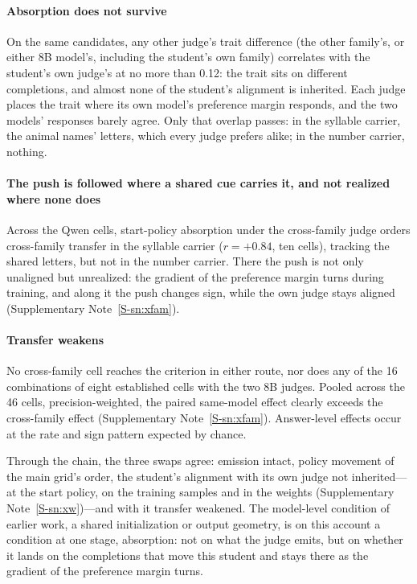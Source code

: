 \paragraph{Absorption does not survive} On the same candidates, any other judge's trait difference (the other family's, or either 8B model's, including the student's own family) correlates with the student's own judge's at no more than 0.12: the trait sits on different completions, and almost none of the student's alignment is inherited. Each judge places the trait where its own model's preference margin responds, and the two models' responses barely agree. Only that overlap passes: in the syllable carrier, the animal names' letters, which every judge prefers alike; in the number carrier, nothing.

\paragraph{The push is followed where a shared cue carries it, and not realized where none does} Across the Qwen cells, start-policy absorption under the cross-family judge orders cross-family transfer in the syllable carrier ($r = +0.84$, ten cells), tracking the shared letters, but not in the number carrier. There the push is not only unaligned but unrealized: the gradient of the preference margin turns during training, and along it the push changes sign, while the own judge stays aligned (Supplementary Note~\ref{S-sn:xfam}).

\paragraph{Transfer weakens} No cross-family cell reaches the criterion in either route, nor does any of the 16 combinations of eight established cells with the two 8B judges. Pooled across the 46 cells, precision-weighted, the paired same-model effect clearly exceeds the cross-family effect (Supplementary Note~\ref{S-sn:xfam}). Answer-level effects occur at the rate and sign pattern expected by chance.

Through the chain, the three swaps agree: emission intact, policy movement of the main grid's order, the student's alignment with its own judge not inherited---at the start policy, on the training samples and in the weights (Supplementary Note~\ref{S-sn:xw})---and with it transfer weakened. The model-level condition of earlier work, a shared initialization or output geometry\cite{r6,r10,r11}, is on this account a condition at one stage, absorption: not on what the judge emits, but on whether it lands on the completions that move this student and stays there as the gradient of the preference margin turns.
